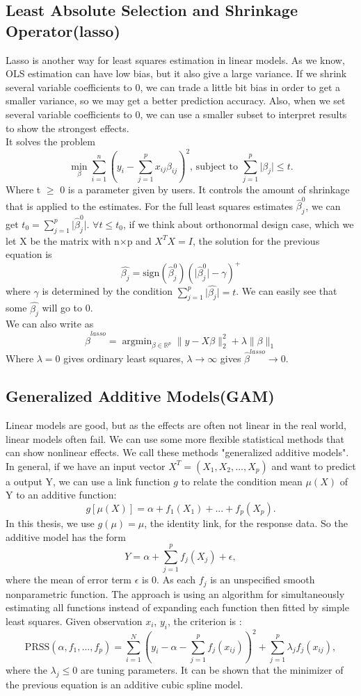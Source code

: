 \documentclass[11pt]{article}
\DeclareMathOperator*{\argminB}{argmin}   %
\begin{document}
\subsection{Least Absolute Selection and Shrinkage Operator(lasso)}  
Lasso is another way for least squares estimation in linear models. As we know, OLS estimation can have low bias, but it also give a large variance. If we shrink several variable coefficients to 0, we can trade a little bit bias in order to get a smaller variance, so we may get a better prediction accuracy. Also, when we set several variable coefficients to 0, we can use a smaller subset to interpret results to show the strongest effects.  \\
It solves the problem $$\min_{\beta} \sum_{i=1}^{n} (y_i-\sum_{j=1}^{p} x_{ij}\beta_{ij})^2 \text{, subject to } \sum_{j=1}^{p} \lvert \beta_j \rvert \leq t.$$
Where t $\geq$ 0 is a parameter given by users. It controls the amount of shrinkage that is applied to the estimates. For the full least squares estimates $\hat{\beta}^0_j$, we can get $t_0=\sum_{j=1}^{p} \lvert \hat{\beta}^0_j \rvert$. $\forall t \leq t_0$, if we think about orthonormal design case, which we let X be the matrix with n$\times$p and $X^TX = I$, the solution for the previous equation is $$\hat{\beta_j}=\text{sign}(\hat{\beta}^0_j)(\lvert \hat{\beta}^0_j \rvert - \gamma)^+$$ where $\gamma$ is determined by the condition $\sum_{j=1}^{p} \lvert \hat{\beta_j} \rvert = t$. We can easily see that some $\hat{\beta_j}$ will go to 0. \\
We can also write as $$\hat\beta^{lasso}=\argminB_{\beta \in \mathbb{R}^p} \lVert y-X\beta\rVert^2_2+\lambda\lVert \beta \rVert_1$$
Where $\lambda=0$ gives ordinary least squares, $\lambda\to\infty$ gives $\hat\beta^{lasso}\to0$. 

\subsection{Generalized Additive Models(GAM)}  
Linear models are good, but as the effects are often not linear in the real world, linear models often fail. We can use some more flexible statistical methods that can show nonlinear effects. We call these methods "generalized additive models". In general, if we have an input vector $X^T=(X_1,X_2,...,X_p)$ and want to predict a output Y, we can use a link function $g$ to relate the condition mean $\mu(X)$ of Y to an additive function: $$g[\mu(X)] = \alpha + f_1(X_1) + ... + f_p(X_p).$$ In this thesis, we use $g(\mu) = \mu$, the identity link, for the response data. So the additive model has the form $$Y=\alpha+\sum_{j=1}^{p} f_j(X_j)+\epsilon,$$
where the mean of error term $\epsilon$ is 0. As each $f_j$ is an unspecified smooth nonparametric function. The approach is using an algorithm for simultaneously estimating all functions instead of expanding each function then fitted by simple least squares. Given observation $x_i$, $y_i$, the criterion is : $$\text{PRSS}(\alpha,f_1,...,f_p) = \sum_{i=1}^{N} (y_i-\alpha-\sum_{j=1}^{p}f_j(x_{ij}))^2+\sum_{j=1}^{p} \lambda_jf_j(x_{ij}),$$ where the $\lambda_j \leq 0$ are tuning parameters. It can be shown that the minimizer of the previous equation is an additive cubic spline model.
\end{document}
